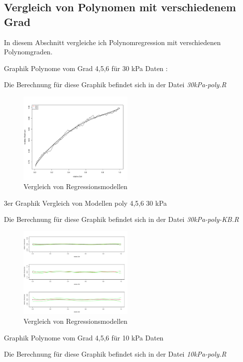 \documentclass[12pt,a4paper]{article}
\theoremstyle{definition}
\theoremstyle{definition}
\theoremstyle{definition}
\begin{document}
\subsection{Vergleich von Polynomen mit verschiedenem Grad}
In diesem Abschnitt vergleiche ich Polynomregression mit verschiedenen Polynomgraden.

Graphik Polynome vom Grad 4,5,6 für 30 kPa Daten :

Die Berechnung für diese Graphik befindet sich in der Datei \textit{30kPa-poly.R}

\begin{figure}[H] 
  \centering
     \includegraphics[width=0.5\textwidth]{30kPa-poly.pdf}
  \caption{Vergleich von Regressionsmodellen}
  \label{fig:11}
\end{figure}

3er Graphik Vergleich von Modellen poly 4,5,6 30 kPa

Die Berechnung für diese Graphik befindet sich in der Datei \textit{30kPa-poly-KB.R}

\begin{figure}[H] 
  \centering
     \includegraphics[width=0.5\textwidth]{30kPa-poly-KB.pdf}
  \caption{Vergleich von Regressionsmodellen}
  \label{fig:12}
\end{figure}

Graphik Polynome vom Grad 4,5,6 für 10 kPa Daten

Die Berechnung für diese Graphik befindet sich in der Datei \textit{10kPa-poly.R}
\end{document}
